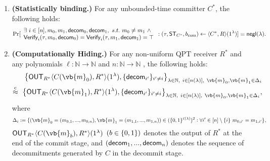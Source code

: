 \begin{definition}
\begin{enumerate}
\item
{\bf (Statistically binding.)} For any unbounded-time committer $C^*$, the following holds: 
\begin{align*}
    \Pr[
    \begin{array}{l}
    \exists~i\in[n],m_0,m_1,\mathsf{decom}_0,\mathsf{decom}_1,~s.t.~m_0\neq m_1 ~\land\\
     \mathsf{Verify}_i(\tau,m_0,\mathsf{decom}_0)=\mathsf{Verify}_i(\tau,m_1,\mathsf{decom}_1)=\top
    \end{array}
    :(\tau,\mathsf{ST}_{C^*},b_{\mathrm{com}}) \gets \langle C^*, R \rangle(1^\lambda)]=\mathsf{negl}(\lambda).
\end{align*}

\item
{\bf (Computationally Hiding.)} For any non-uniform QPT receiver $R^*$ and any polynomials $\ell : \mathbb{N} \rightarrow \mathbb{N}$
and 
$n : \mathbb{N} \rightarrow \mathbb{N}$
, the following holds:
\begin{align*}
\big\{ \OUT_{R^*}\langle C(\vb{m}_0),R^* \rangle(1^\secpar),\{\decom_{i'}\}_{i'\ne i}\big\}_{\secpar \in \mathbb{N},~i\in[n(\secpar)], ~\vb{m}_0, \vb{m}_1 \in \Delta_i}\\
\cind~ \big\{ \OUT_{R^*}\langle C(\vb{m}_1),R^* \rangle(1^\secpar),\{\decom_{i'}\}_{i'\ne i}\big\}_{\secpar \in \mathbb{N},~i\in[n(\secpar)],  ~\vb{m}_0, \vb{m}_1 \in \Delta_i},
\end{align*}
where 
$$
\Delta_i:=\{(\vb{m}_0=(m_{0,1},...,m_{0,n}), \vb{m}_1=(m_{1,1},...,m_{1,n}))\in (\bits^{\ell(\secpar)})^2
: \forall i'\in[n]\setminus \{i\}~m_{0,i'}=m_{1,i'}\}
,$$ 
$\OUT_{R^*}\langle C(\vb{m}_b),R^* \rangle(1^\secpar)$ $(b \in \{0,1\})$ denotes the output of $R^*$ at the end of the commit stage, 
and $(\mathsf{decom}_1,...,\mathsf{decom}_n)$ denotes the sequence of decommitments generated by $C$ in the decommit stage.
\end{enumerate}
\end{definition}
